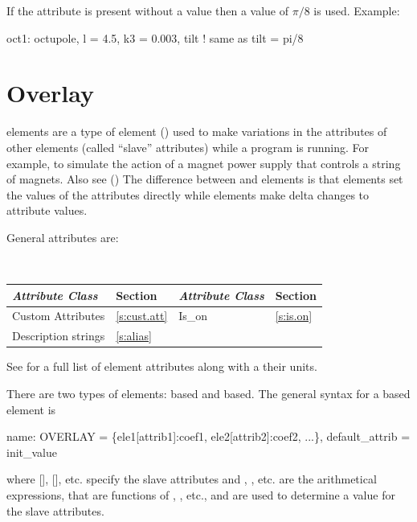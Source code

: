 {
If the  attribute is present without a value then a value of 
$\pi/8$ is used.
Example:
\begin{example}
  oct1: octupole, l = 4.5, k3 = 0.003, tilt ! same as tilt = pi/8
\end{example}

\section{Overlay}
\label{s:overlay}

 elements are a type of  element () used to make
variations in the attributes of other elements (called ``slave'' attributes) while a program is
running. For example, to simulate the action of a magnet power supply that controls a string of
magnets. Also see  () The difference between  and 
elements is that  elements set the values of the attributes directly while 
elements make delta changes to attribute values.

General  attributes are:
\begin{center}
\tt
\begin{tabular}{llll} \toprule
  {\sl Attribute Class}      & Section           & {\sl Attribute Class}      & Section         \\ \midrule
  Custom Attributes          & \ref{s:cust.att}  & Is_on                      & \ref{s:is.on}   \\
  Description strings        & \ref{s:alias}     &                            &                 \\ 
  \bottomrule
\end{tabular}
\end{center}
\toffset
See  for a full list of element attributes along with a their units.

There are two types of  elements:  based and  based.
The general syntax for a  based  element is
\begin{example}
  name: OVERLAY = \{ele1[attrib1]:coef1, ele2[attrib2]:coef2, ...\}, 
                                                       default_attrib = init_value
\end{example}
where [], [], etc. specify the slave attributes and
, , etc. are the arithmetical expressions, that are functions of ,
, etc., and are used to determine a value for the slave attributes.

}
